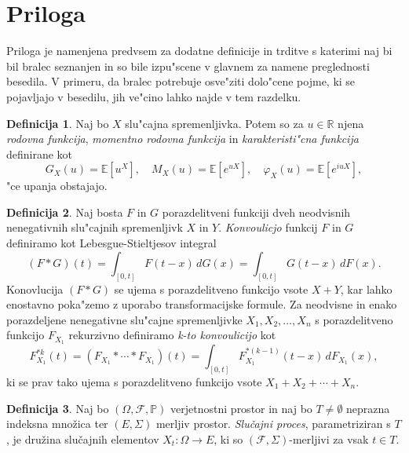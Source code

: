 \documentclass[12pt, a4paper, reqno]{amsart}
\theoremstyle{definition}
\newtheorem{definicija}{Definicija}[section]
\theoremstyle{plain}
\newcommand{\R}{\mathbb{R}}
\newcommand{\E}{\mathbb{E}}
\newcommand{\1}{\mathds{1}}
\begin{document}
        \newpage

\section{Priloga}
    Priloga je namenjena predvsem za dodatne definicije in trditve s katerimi naj bi bil bralec seznanjen in 
    so bile izpu"scene v glavnem za namene preglednosti besedila. V primeru, da bralec potrebuje osve"ziti dolo"cene pojme, ki 
    se pojavljajo v besedilu, jih ve"cino lahko najde v tem razdelku.
    \begin{definicija}
        Naj bo $X$ slu"cajna spremenljivka. Potem so za $u\in\R$ njena \textit{rodovna funkcija}, 
        \textit{momentno rodovna funkcija} in \textit{karakteristi"cna funkcija} definirane 
        kot 
        \begin{equation*}
            G_X(u) = \E\left[u^X\right], \quad M_X(u) = \E\left[e^{uX}\right], \quad \varphi_X(u) = \E\left[e^{iuX}\right],
        \end{equation*}
        "ce upanja obstajajo.
        \label{def:rodovneFunkcije}
    \end{definicija}

    \begin{definicija}
        Naj bosta $F$ in $G$ porazdelitveni funkciji dveh neodvisnih nenegativnih slu"cajnih 
        spremenljivk $X$ in $Y$. \textit{Konvoulicjo} funkcij $F$ in $G$ definiramo kot
        Lebesgue-Stieltjesov integral
        \begin{equation*}
            (F*G)(t) = \int_{[0, t]}F(t - x)\, dG(x) = \int_{[0, t]}G(t - x)\, dF(x).
        \end{equation*} 
        Konovlucija $(F*G)$ se ujema s porazdelitveno funkcijo vsote $X + Y$, kar lahko 
        enostavno poka"zemo z uporabo transformacijske formule.
        Za neodvisne in enako porazdeljene nenegativne slu"cajne spremenljivke $X_1, X_2, \dots, X_n$ 
        s porazdelitveno funkcijo $F_{X_1}$ rekurzivno definiramo \textit{k-to konvoulicijo} kot
        \begin{equation*}
            F_{X_1}^{*k}(t) = (F_{X_1}*\cdots*F_{X_1})(t) = \int_{[0, t]}F_{X_1}^{*(k-1)}(t - x)\, dF_{X_1}(x),
        \end{equation*}
        ki se prav tako ujema s porazdelitveno funkcijo vsote $X_1 + X_2 + \cdots + X_n$. 
        \label{def:konvolucija}
    \end{definicija}

    \begin{definicija}
        Naj bo $(\Omega, \mathcal{F}, \mathbb{P})$ verjetnostni prostor in naj bo $T\neq\emptyset$
        neprazna indeksna množica ter $(E, \Sigma)$ merljiv prostor. \textit{Slučajni proces}, 
        parametriziran s $T$, je družina slučajnih elementov $X_t : \Omega \to E$,
         ki so $(\mathcal{F}, \Sigma)$-merljivi za vsak $t \in T$.
        \label{def:slucProc}
    \end{definicija}
\end{document}
